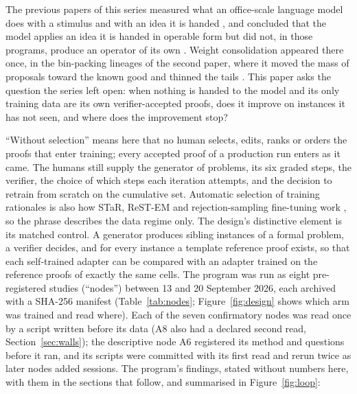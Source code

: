 \documentclass[11pt]{article}
\begin{document}
The previous papers of this series measured what an office-scale language
model does with a stimulus and with an idea it is handed
\citep{ono2026interrupting,ono2026mass,ono2026operator,ono2026pulsed}, and concluded that the model applies an idea it is handed in operable form but did not, in those programs, produce an operator of its own \citep{ono2026operable}. Weight consolidation appeared there once, in the
bin-packing lineages of the second paper, where it moved the mass of
proposals toward the known good and thinned the tails \citep{ono2026mass}.
This paper asks the question the series left open: when nothing is handed to the model and its only training data are its own verifier-accepted proofs, does it improve on instances it has not seen, and where does the improvement stop?

``Without selection'' means here that no human selects, edits, ranks or
orders the proofs that enter training; every accepted proof of a
production run enters as it came. The humans still supply the generator of
problems, its six graded steps, the verifier, the choice of which steps
each iteration attempts, and the decision to retrain from scratch on the
cumulative set. Automatic selection of training rationales is also how
STaR, ReST-EM and rejection-sampling fine-tuning work
\citep{zelikman2022star,singh2024restem,yuan2023scaling}, so the phrase describes the data regime only. The design's distinctive element is its matched control. A generator produces sibling
instances of a formal problem, a verifier decides, and for every instance
a template reference proof exists, so that each self-trained adapter can
be compared with an adapter trained on the reference proofs of exactly
the same cells. The program was run as eight pre-registered studies
(``nodes'') between 13 and 20 September 2026, each archived with a
SHA-256 manifest (Table~\ref{tab:nodes}; Figure~\ref{fig:design} shows
which arm was trained and read where). Each of the seven confirmatory
nodes was read once by a script written before its data (A8 also had a
declared second read, Section~\ref{sec:walls}); the descriptive node A6
registered its method and questions before it ran, and its scripts were
committed with its first read and rerun twice as later nodes added
sessions. The program's findings, stated without numbers here, with them
in the sections that follow, and summarised in Figure~\ref{fig:loop}:
\end{document}
